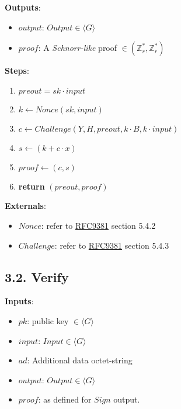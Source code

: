 \documentclass[
]{article}
\providecommand{\tightlist}{%
  \setlength{\itemsep}{0pt}\setlength{\parskip}{0pt}}
\begin{document}
\textbf{Outputs}:

\begin{itemize}
\tightlist
\item
  \(output\): \(Output \in \langle G \rangle\)
\item
  \(proof\): A \emph{Schnorr-like} proof
  \(\in (\mathbb{Z}^*_r, \mathbb{Z}^*_r)\)
\end{itemize}

\textbf{Steps}:

\begin{enumerate}
\def\labelenumi{\arabic{enumi}.}
\tightlist
\item
  \(preout = sk \cdot input\)
\item
  \(k \leftarrow Nonce(sk, input)\)
\item
  \(c \leftarrow Challenge(Y, H, preout, k \cdot B, k \cdot input)\)
\item
  \(s \leftarrow (k + c \cdot x)\)
\item
  \(proof \leftarrow (c, s)\)
\item
  \textbf{return} \((preout, proof)\)
\end{enumerate}

\textbf{Externals}:

\begin{itemize}
\tightlist
\item
  \(Nonce\): refer to
  \href{https://datatracker.ietf.org/doc/rfc9381/}{RFC9381} section
  5.4.2
\item
  \(Challenge\): refer to
  \href{https://datatracker.ietf.org/doc/rfc9381/}{RFC9381} section
  5.4.3
\end{itemize}

\hypertarget{verify}{%
\subsection{3.2. Verify}\label{verify}}

\textbf{Inputs}:

\begin{itemize}
\tightlist
\item
  \(pk\): public key \(\in \langle G \rangle\)
\item
  \(input\): \(Input \in \langle G \rangle\)
\item
  \(ad\): Additional data octet-string
\item
  \(output\): \(Output \in \langle G \rangle\)
\item
  \(proof\): as defined for \(Sign\) output.
\end{itemize}
\end{document}
